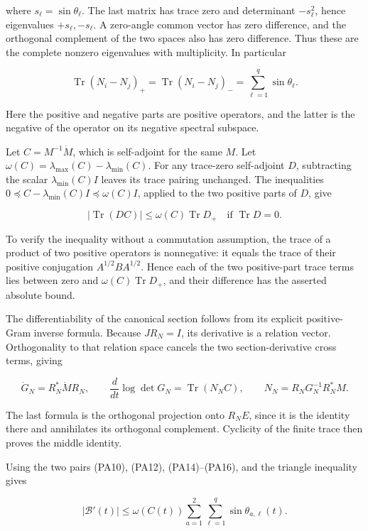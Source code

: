 \documentclass{article}
\begin{document}
where \(s_\ell=\sin\theta_\ell\). The last matrix has trace zero and determinant \(-s_\ell^2\), hence eigenvalues \(+s_\ell,-s_\ell\). A zero-angle common vector has zero difference, and the orthogonal complement of the two spaces also has zero difference. Thus these are the complete nonzero eigenvalues with multiplicity. In particular

\[
\operatorname{Tr}(N_i-N_j)_+
=\operatorname{Tr}(N_i-N_j)_-
=\sum_{\ell=1}^q\sin\theta_\ell.
\tag{PA14}
\]

Here the positive and negative parts are positive operators, and the latter is the negative of the operator on its negative spectral subspace.

Let \(C=M^{-1}\dot M\), which is self-adjoint for the same \(M\). Let \(\omega(C)=\lambda_{\max}(C)-\lambda_{\min}(C)\). For any trace-zero self-adjoint \(D\), subtracting the scalar \(\lambda_{\min}(C)I\) leaves its trace pairing unchanged. The inequalities \(0\preceq C-\lambda_{\min}(C)I\preceq\omega(C)I\), applied to the two positive parts of \(D\), give

\[
|\operatorname{Tr}(DC)|
\le\omega(C)\operatorname{Tr}D_+
\quad\text{if }\operatorname{Tr}D=0.
\tag{PA15}
\]

To verify the inequality without a commutation assumption, the trace of a product of two positive operators is nonnegative: it equals the trace of their positive conjugation \(A^{1/2}BA^{1/2}\). Hence each of the two positive-part trace terms lies between zero and \(\omega(C)\operatorname{Tr}D_+\), and their difference has the asserted absolute bound.

The differentiability of the canonical section follows from its explicit positive-Gram inverse formula. Because \(JR_N=I\), its derivative is a relation vector. Orthogonality to that relation space cancels the two section-derivative cross terms, giving

\[
\dot G_N=R_N^*\dot M R_N,
\qquad
\frac{d}{dt}\log\det G_N
=\operatorname{Tr}(N_NC),
\qquad N_N=R_NG_N^{-1}R_N^*M.
\tag{PA16}
\]

The last formula is the orthogonal projection onto \(R_NE\), since it is the identity there and annihilates its orthogonal complement. Cyclicity of the finite trace then proves the middle identity.

Using the two pairs (PA10), (PA12), (PA14)--(PA16), and the triangle inequality gives

\[
\boxed{
|\mathcal B'(t)|
\le \omega(C(t))\sum_{a=1}^2\sum_{\ell=1}^q
                  \sin\theta_{a,\ell}(t).
}
\tag{PA17}
\]
\end{document}
